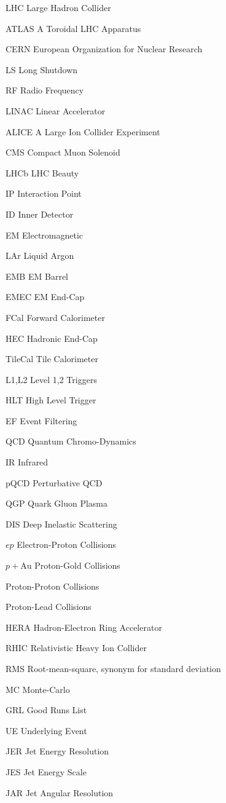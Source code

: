
\begin{symbollist*}
\item [LHC] Large Hadron Collider
\item [ATLAS] A Toroidal LHC Apparatus
\item [CERN] European Organization for Nuclear Research
\item [LS] Long Shutdown
\item [RF] Radio Frequency
\item [LINAC] Linear Accelerator
\item [ALICE] A Large Ion Collider Experiment
\item [CMS] Compact Muon Solenoid
\item [LHCb] LHC Beauty
\item [IP] Interaction Point
\item [ID] Inner Detector
\item [EM] Electromagnetic
\item [LAr] Liquid Argon
\item [EMB] EM Barrel
\item [EMEC] EM End-Cap
\item [FCal] Forward Calorimeter
\item [HEC] Hadronic End-Cap
\item [TileCal] Tile Calorimeter
\item [L1,L2] Level 1,2 Triggers
\item [HLT] High Level Trigger
\item [EF] Event Filtering
\item [QCD] Quantum Chromo-Dynamics
\item [IR] Infrared
\item [pQCD] Perturbative QCD
\item [QGP] Quark Gluon Plasma
\item [DIS] Deep Inelastic Scattering
\item [$ep$] Electron-Proton Collisions
\item [$p+\mathrm{Au}$] Proton-Gold Collisions
\item [\pp] Proton-Proton Collisions
\item [\pPb] Proton-Lead Collisions
\item [HERA] Hadron-Electron Ring Accelerator
\item [RHIC] Relativistic Heavy Ion Collider
\item [RMS] Root-mean-square, synonym for standard deviation
\item [MC] Monte-Carlo
\item [GRL] Good Runs List
\item [UE] Underlying Event
\item [JER] Jet Energy Resolution
\item [JES] Jet Energy Scale
\item [JAR] Jet Angular Resolution
\end{symbollist*}
